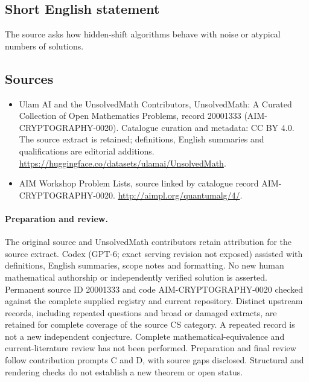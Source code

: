 \documentclass[11pt]{article}
\begin{document}
\subsection{Short English statement}
The source asks how hidden-shift algorithms behave with noise or atypical numbers of solutions.
\subsection{Sources}
\begin{itemize}
\item[\hypertarget{source:20001333:1}{S1}] Ulam AI and the UnsolvedMath Contributors, UnsolvedMath: A Curated Collection of Open Mathematics Problems, record 20001333 (AIM-CRYPTOGRAPHY-0020). Catalogue curation and metadata: CC BY 4.0. The source extract is retained; definitions, English summaries and qualifications are editorial additions.
\url{https://huggingface.co/datasets/ulamai/UnsolvedMath}.
\item[\hypertarget{source:20001333:2}{S2}] AIM Workshop Problem Lists, source linked by catalogue record AIM-CRYPTOGRAPHY-0020.
\url{http://aimpl.org/quantumalg/4/}.
\end{itemize}
\paragraph{Preparation and review.}
The original source and UnsolvedMath contributors retain attribution for the source extract. Codex (GPT-6; exact serving revision not exposed) assisted with definitions, English summaries, scope notes and formatting. No new human mathematical authorship or independently verified solution is asserted. Permanent source ID 20001333 and code AIM-CRYPTOGRAPHY-0020 checked against the complete supplied registry and current repository. Distinct upstream records, including repeated questions and broad or damaged extracts, are retained for complete coverage of the source CS category. A repeated record is not a new independent conjecture. Complete mathematical-equivalence and current-literature review has not been performed. Preparation and final review follow contribution prompts C and D, with source gaps disclosed. Structural and rendering checks do not establish a new theorem or open status.
\label{end:20001333}
\end{document}
